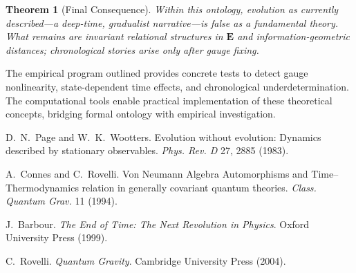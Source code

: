 \documentclass[11pt]{article}
\theoremstyle{definition}
\theoremstyle{plain}
\newtheorem{theorem}[definition]{Theorem}
\theoremstyle{remark}
\newcommand{\Ecat}{\mathbf{E}}      %
\begin{document}
\begin{theorem}[Final Consequence]
Within this ontology, \emph{evolution as currently described}—a deep-time, gradualist narrative—is false as a fundamental theory. What remains are invariant relational structures in $\Ecat$ and information-geometric distances; chronological stories arise only after gauge fixing.
\end{theorem}

The empirical program outlined provides concrete tests to detect gauge nonlinearity, state-dependent time effects, and chronological underdetermination. The computational tools enable practical implementation of these theoretical concepts, bridging formal ontology with empirical investigation.


\begin{thebibliography}{9}

D.~N.~Page and W.~K.~Wootters.
\newblock Evolution without evolution: Dynamics described by stationary observables.
\newblock \emph{Phys. Rev. D} 27, 2885 (1983).

A.~Connes and C.~Rovelli.
\newblock Von Neumann Algebra Automorphisms and Time–Thermodynamics relation in generally covariant quantum theories.
\newblock \emph{Class. Quantum Grav.} 11 (1994).

J.~Barbour.
\newblock \emph{The End of Time: The Next Revolution in Physics}.
\newblock Oxford University Press (1999).

C.~Rovelli.
\newblock \emph{Quantum Gravity}.
\newblock Cambridge University Press (2004).

\end{thebibliography}
\end{document}
